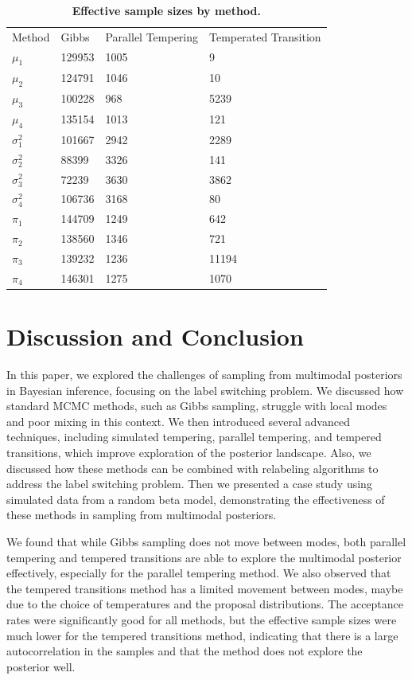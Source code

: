 \documentclass[11pt]{article}
\begin{document}
\begin{table}[!ht]

\caption{\textbf{Effective sample sizes by method.}}
\centering
\begin{tabular}[t]{llll}
\toprule
Method & Gibbs & Parallel Tempering & Temperated Transition\\
$\mu_1$ & 129953 & 1005 & 9 \\
$\mu_2$ & 124791 & 1046 & 10\\
$\mu_3$ & 100228 & 968 & 5239\\
$\mu_4$ & 135154 & 1013 & 121\\
\addlinespace
$\sigma_1^2$ & 101667 & 2942 & 2289\\
$\sigma_2^2$ & 88399 & 3326 & 141\\
$\sigma_3^2$ & 72239 & 3630 & 3862\\
$\sigma_4^2$ & 106736 & 3168 & 80\\
\addlinespace
$\pi_1$ & 144709 & 1249 & 642 \\
$\pi_2$ & 138560 & 1346 & 721 \\
$\pi_3$ & 139232 & 1236 & 11194 \\
$\pi_4$ & 146301 & 1275 & 1070 \\
\bottomrule
\end{tabular}
\label{tab:effective_sample_sizes}
\end{table}

\section{Discussion and Conclusion}

In this paper, we explored the challenges of sampling from multimodal posteriors in Bayesian inference, 
focusing on the label switching problem. We discussed how standard MCMC methods, such as Gibbs sampling,
struggle with local modes and poor mixing in this context. We then introduced several advanced techniques,
including simulated tempering, parallel tempering, and tempered transitions, which improve exploration of the
posterior landscape. Also, we discussed how these methods can be combined with relabeling algorithms to address
the label switching problem. Then we presented a case study using simulated data from a random beta model, 
demonstrating the effectiveness of these methods in sampling from multimodal posteriors. 

We found that while Gibbs sampling does not move between modes, both parallel tempering and tempered transitions
are able to explore the multimodal posterior effectively, especially for the parallel tempering method. We also
observed that the tempered transitions method has a limited movement between modes, maybe due to the choice of
temperatures and the proposal distributions. The acceptance rates were significantly good for all methods, but
the effective sample sizes were much lower for the tempered transitions method, indicating that there is a
large autocorrelation in the samples and that the method does not explore the posterior well.
\end{document}
